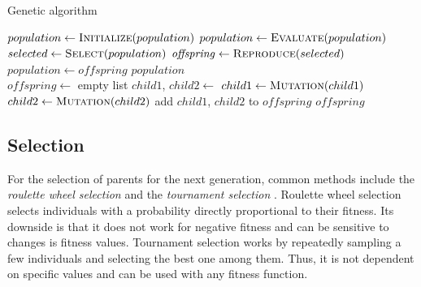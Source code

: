 \begin{algorithm}
    
    \begin{algorithmic}
    \caption{Genetic algorithm} \label{alg:genetic_algorithm}
    \State $population \gets \Call{Initialize}{population}$
    \State $population \gets \Call{Evaluate}{population}$
    \State $selected \gets \Call{Select}{population}$
    \State $\mathit{offspring} \gets \Call{Reproduce}{selected}$
    \State $population \gets \mathit{offspring}$
    \EndFor
    \State \Return $population$
    \EndFunction
    \\
    \State $\mathit{offspring} \gets$ empty list
    \State $child1$, $child2 \gets$ 
    \State $child1 \gets \Call{Mutation}{child1}$
    \EndIf
    \State $child2 \gets \Call{Mutation}{child2}$
    \EndIf
    \State add $child1$, $child2$ to $\mathit{offspring}$
    \EndFor
    \State \Return $\mathit{offspring}$
    \EndFunction
\end{algorithmic}
\end{algorithm}

\subsection{Selection}

For the selection of parents for the next generation, common methods include the \textit{roulette wheel selection} and the \textit{tournament selection} \cite{vanneschi2023lectures}. Roulette wheel selection selects individuals with a probability directly proportional to their fitness. Its downside is that it does not work for negative fitness and can be sensitive to changes is fitness values. Tournament selection works by repeatedly sampling a few individuals and selecting the best one among them. Thus, it is not dependent on specific values and can be used with any fitness function.

